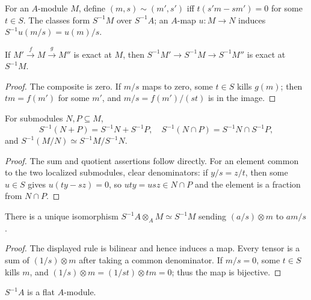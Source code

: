 \begin{definition}
\label{am-def-module-localization}
\uses{}
For an $A$-module $M$, define $(m,s)\sim(m',s')$ iff
$t(s'm-sm')=0$ for some $t\in S$.  The classes form $S^{-1}M$ over
$S^{-1}A$; an $A$-map $u:M\to N$ induces $S^{-1}u(m/s)=u(m)/s$.
\end{definition}
\begin{proposition}
\label{am-prop-3-3}
\uses{}
If $M'\xrightarrow fM\xrightarrow gM''$ is exact at $M$, then
$S^{-1}M'\to S^{-1}M\to S^{-1}M''$ is exact at $S^{-1}M$.
\end{proposition}
\begin{proof}
The composite is zero.  If $m/s$ maps to zero, some $t\in S$ kills $g(m)$;
then $tm=f(m')$ for some $m'$, and $m/s=f(m')/(st)$ is in the image.
\end{proof}
\begin{corollary}
\label{am-cor-3-4}
\uses{}
For submodules $N,P\subseteq M$,
\[
S^{-1}(N+P)=S^{-1}N+S^{-1}P,\quad
S^{-1}(N\cap P)=S^{-1}N\cap S^{-1}P,
\]
and $S^{-1}(M/N)\simeq S^{-1}M/S^{-1}N$.
\end{corollary}
\begin{proof}
The sum and quotient assertions follow directly.  For an element common to
the two localized submodules, clear denominators: if $y/s=z/t$, then some
$u\in S$ gives $u(ty-sz)=0$, so $uty=usz\in N\cap P$ and the element is a
fraction from $N\cap P$.
\end{proof}
\begin{proposition}
\label{am-prop-3-5}
\uses{}
There is a unique isomorphism
$S^{-1}A\otimes_A M\simeq S^{-1}M$ sending $(a/s)\otimes m$ to $am/s$.
\end{proposition}
\begin{proof}
The displayed rule is bilinear and hence induces a map.  Every tensor is a
sum of $(1/s)\otimes m$ after taking a common denominator.  If $m/s=0$,
some $t\in S$ kills $m$, and $(1/s)\otimes m=(1/st)\otimes tm=0$; thus the
map is bijective.
\end{proof}
\begin{corollary}
\label{am-cor-3-6}
\uses{}
$S^{-1}A$ is a flat $A$-module.
\end{corollary}
